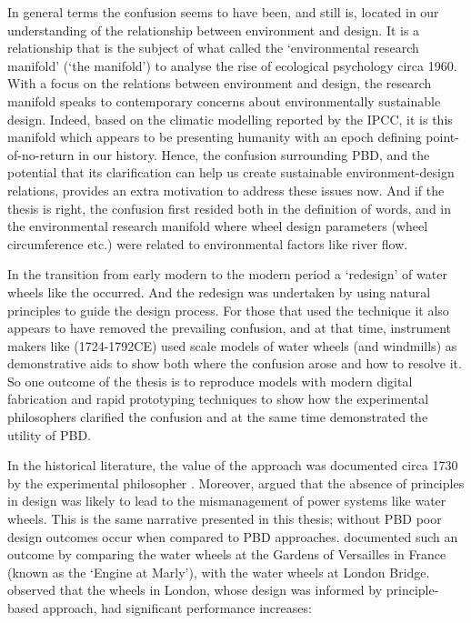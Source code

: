 \documentclass[a4paper, 12pt]{article}
\begin{document}
In general terms the confusion seems to have been, and still is, located in our understanding of the relationship between environment and design. It is a relationship that is the subject of what \citeauthor{busbea_responsive_2019} \citeyearpar{busbea_responsive_2019} called the `environmental research manifold' (`the manifold') to analyse the rise of ecological psychology circa 1960. With a focus on the relations between environment and design, the research manifold speaks to contemporary concerns about environmentally sustainable design. Indeed, based on the climatic modelling reported by the IPCC, it is this manifold which appears to be presenting humanity with an epoch defining point-of-no-return in our history. Hence, the confusion surrounding PBD, and the potential that its clarification can help us create sustainable environment-design relations, provides an extra motivation to address these issues now. And if the thesis is right, the confusion first resided both in the definition of words, and in the environmental research manifold where wheel design parameters (wheel circumference etc.) were related to environmental factors like river flow.

In the transition from early modern to the modern period a `redesign' of water wheels like the \SE occurred. And the redesign was undertaken by using natural principles to guide the design process. For those that used the technique it also appears to have removed the prevailing confusion, and at that time, instrument makers like \citeauthor{smeaton_experimental_1759} (1724-1792CE) used scale models of water wheels (and windmills) as demonstrative aids to show both where the confusion arose and how to resolve it. So one outcome of the thesis is to reproduce \citeauthor{smeaton_experimental_1759} models with modern digital fabrication and rapid prototyping techniques to show how the experimental philosophers clarified the confusion and at the same time demonstrated the utility of PBD.

In the historical literature, the value of the approach was documented circa 1730 by the experimental philosopher \citeauthor{desaguliers_course_1734}. Moreover, \citeauthor{desaguliers_course_1734} argued that the absence of principles in design was likely to lead to the mismanagement of power systems like water wheels. This is the same narrative presented in this thesis; without PBD poor design outcomes occur when compared to PBD approaches. \citeauthor{desaguliers_course_1734} documented such an outcome by comparing the water wheels at the Gardens of Versailles in France (known as the `Engine at Marly'), with the water wheels at London Bridge. \citeauthor{desaguliers_course_1734} observed that the wheels in London, whose design was informed by principle-based approach, had significant performance increases: 
\end{document}
